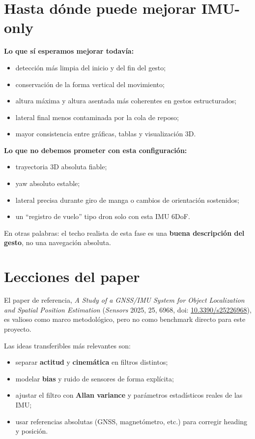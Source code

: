 \documentclass[11pt,a4paper]{article}
\begin{document}
\section{Hasta d\'onde puede mejorar IMU-only}
\textbf{Lo que s\'i esperamos mejorar todav\'ia:}
\begin{itemize}[leftmargin=14pt]
  \item detecci\'on m\'as limpia del inicio y del fin del gesto;
  \item conservaci\'on de la forma vertical del movimiento;
  \item altura m\'axima y altura asentada m\'as coherentes en gestos estructurados;
  \item lateral final menos contaminada por la cola de reposo;
  \item mayor consistencia entre gr\'aficas, tablas y visualizaci\'on 3D.
\end{itemize}

\textbf{Lo que no debemos prometer con esta configuraci\'on:}
\begin{itemize}[leftmargin=14pt]
  \item trayectoria 3D absoluta fiable;
  \item yaw absoluto estable;
  \item lateral precisa durante giro de manga o cambios de orientaci\'on sostenidos;
  \item un ``registro de vuelo'' tipo dron solo con esta IMU 6DoF.
\end{itemize}

En otras palabras: el techo realista de esta fase es una \textbf{buena descripci\'on del gesto}, no una navegaci\'on absoluta.

\section{Lecciones del paper}
El paper de referencia, \emph{A Study of a GNSS/IMU System for Object Localization and Spatial Position Estimation} (\textit{Sensors} 2025, 25, 6968, doi: \href{https://doi.org/10.3390/s25226968}{10.3390/s25226968}), es valioso como marco metodol\'ogico, pero no como benchmark directo para este proyecto.

Las ideas transferibles m\'as relevantes son:
\begin{itemize}[leftmargin=14pt]
  \item separar \textbf{actitud} y \textbf{cinem\'atica} en filtros distintos;
  \item modelar \textbf{bias} y ruido de sensores de forma expl\'icita;
  \item ajustar el filtro con \textbf{Allan variance} y par\'ametros estad\'isticos reales de las IMU;
  \item usar referencias absolutas (GNSS, magnet\'ometro, etc.) para corregir heading y posici\'on.
\end{itemize}
\end{document}
